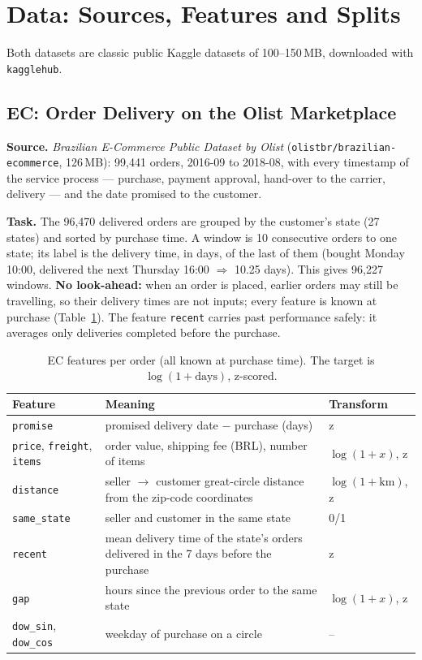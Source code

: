 \documentclass[11pt, a4paper]{article}
\begin{document}
\section{Data: Sources, Features and Splits}
\label{sec:data}

Both datasets are classic public Kaggle datasets of 100--150\,MB, downloaded with \texttt{kagglehub}.

\subsection{EC: Order Delivery on the Olist Marketplace}

\textbf{Source.} \emph{Brazilian E-Commerce Public Dataset by Olist} (\texttt{olistbr/brazilian-ecommerce}, 126\,MB): 99{,}441 orders, 2016-09 to 2018-08, with every timestamp
of the service process — purchase, payment approval, hand-over to the carrier, delivery — and the date promised to the customer.

\textbf{Task.} The 96{,}470 delivered orders are grouped by the customer's state (27 states) and sorted by purchase time. A window is 10 consecutive orders to one state;
its label is the delivery time, in days, of the last of them (bought Monday 10:00, delivered the next Thursday 16:00 $\Rightarrow$ 10.25 days). This gives 96{,}227 windows.
\textbf{No look-ahead:} when an order is placed, earlier orders may still be travelling, so their delivery times are not inputs; every feature is known at purchase
(Table~\ref{tab:ec-feat}). The feature \texttt{recent} carries past performance safely: it averages only deliveries completed before the purchase.

\begin{table}[H]
\centering
\caption{EC features per order (all known at purchase time). The target is $\log(1+\text{days})$, z-scored.}
\label{tab:ec-feat}
\small
\begin{tabularx}{\textwidth}{lXl}
\toprule
Feature & Meaning & Transform \\
\midrule
\texttt{promise} & promised delivery date $-$ purchase (days) & z \\
\texttt{price}, \texttt{freight}, \texttt{items} & order value, shipping fee (BRL), number of items & $\log(1+x)$, z \\
\texttt{distance} & seller $\to$ customer great-circle distance from the zip-code coordinates & $\log(1+\text{km})$, z \\
\texttt{same\_state} & seller and customer in the same state & 0/1 \\
\texttt{recent} & mean delivery time of the state's orders delivered in the 7 days before the purchase & z \\
\texttt{gap} & hours since the previous order to the same state & $\log(1+x)$, z \\
\texttt{dow\_sin}, \texttt{dow\_cos} & weekday of purchase on a circle & -- \\
\bottomrule
\end{tabularx}
\end{table}
\end{document}
